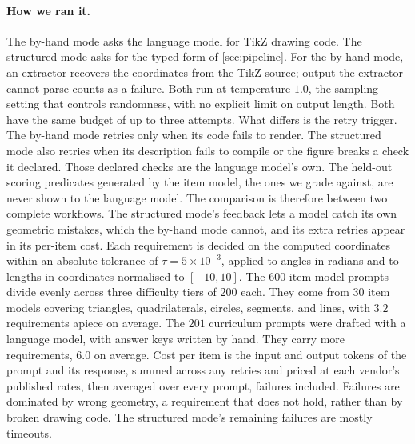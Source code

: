 \paragraph{How we ran it.}
The by-hand mode asks the language model for TikZ drawing code. The structured mode asks for the typed form of \cref{sec:pipeline}. For the by-hand mode, an extractor recovers the coordinates from the TikZ source; output the extractor cannot parse counts as a failure. Both run at temperature $1.0$, the sampling setting that controls randomness, with no explicit limit on output length. Both have the same budget of up to three attempts. What differs is the retry trigger. The by-hand mode retries only when its code fails to render. The structured mode also retries when its description fails to compile or the figure breaks a check it declared. Those declared checks are the language model's own. The held-out scoring predicates generated by the item model, the ones we grade against, are never shown to the language model. The comparison is therefore between two complete workflows. The structured mode's feedback lets a model catch its own geometric mistakes, which the by-hand mode cannot, and its extra retries appear in its per-item cost. Each requirement is decided on the computed coordinates within an absolute tolerance of $\tau = 5\times10^{-3}$, applied to angles in radians and to lengths in coordinates normalised to $[-10, 10]$. The $600$ item-model prompts divide evenly across three difficulty tiers of $200$ each. They come from $30$ item models covering triangles, quadrilaterals, circles, segments, and lines, with $3.2$ requirements apiece on average. The $201$ curriculum prompts were drafted with a language model, with answer keys written by hand. They carry more requirements, $6.0$ on average. Cost per item is the input and output tokens of the prompt and its response, summed across any retries and priced at each vendor's published rates, then averaged over every prompt, failures included. Failures are dominated by wrong geometry, a requirement that does not hold, rather than by broken drawing code. The structured mode's remaining failures are mostly timeouts.


